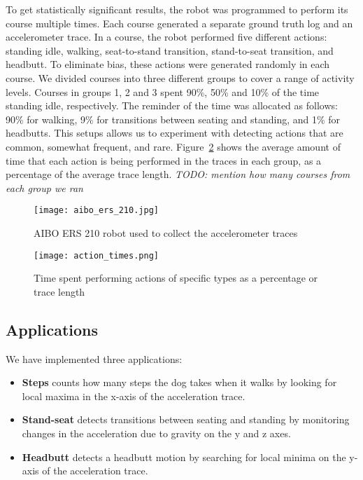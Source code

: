 To get statistically significant results, the robot was programmed to
perform its course multiple times. Each course generated a separate
ground truth log and an accelerometer trace. In a course, the robot
performed five different actions: standing idle, walking,
seat-to-stand transition, stand-to-seat transition, and headbutt. To
eliminate bias, these actions were generated randomly in each
course. We divided courses into three different groups to cover a
range of activity levels. Courses in groups 1, 2 and 3 spent 90\%,
50\% and 10\% of the time standing idle, respectively. The reminder of
the time was allocated as follows: 90\% for walking, 9\% for
transitions between seating and standing, and 1\% for headbutts. This
setups allows us to experiment with detecting actions that are common,
somewhat frequent, and rare. Figure~\ref{fig:actionTimes} shows the
average amount of time that each action is being performed in the
traces in each group, as a percentage of the average trace
length. {\em TODO: mention how many courses from each group we ran}

\begin{figure}[t]
	\texttt{[image: aibo\_ers\_210.jpg]}
	\caption{AIBO ERS 210 robot used to collect the accelerometer traces}
	\label{fig:aibo}
\end{figure}

\begin{figure}[t]
	\texttt{[image: action\_times.png]}
	\caption{Time spent performing actions of specific types as a percentage or trace length}
	\label{fig:actionTimes}
\end{figure}

\subsection{Applications}

We have implemented three applications:

\begin{itemize}

\item {\bf Steps} counts how many steps the dog takes when it walks by
  looking for local maxima in the x-axis of the acceleration trace.


\item {\bf Stand-seat} detects transitions between seating and
  standing by monitoring changes in the acceleration due to gravity on
  the y and z axes.

\item {\bf Headbutt} detects a headbutt motion by searching for local
  minima on the y-axis of the acceleration trace.

\end{itemize}

